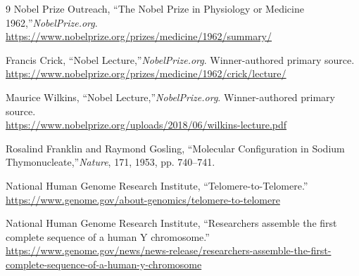 \begin{thebibliography}{9}
Nobel Prize Outreach, ``The Nobel Prize in Physiology or Medicine 1962,''\emph{NobelPrize.org}.\\
\url{https://www.nobelprize.org/prizes/medicine/1962/summary/}

Francis Crick, ``Nobel Lecture,''\emph{NobelPrize.org}. Winner-authored primary source.\\
\url{https://www.nobelprize.org/prizes/medicine/1962/crick/lecture/}

Maurice Wilkins, ``Nobel Lecture,''\emph{NobelPrize.org}. Winner-authored primary source.\\
\url{https://www.nobelprize.org/uploads/2018/06/wilkins-lecture.pdf}

Rosalind Franklin and Raymond Gosling, ``Molecular Configuration in Sodium Thymonucleate,''\textit{Nature}, 171, 1953, pp. 740--741.

National Human Genome Research Institute, ``Telomere-to-Telomere.''\\
\url{https://www.genome.gov/about-genomics/telomere-to-telomere}

National Human Genome Research Institute, ``Researchers assemble the first complete sequence of a human Y chromosome.''\\
\url{https://www.genome.gov/news/news-release/researchers-assemble-the-first-complete-sequence-of-a-human-y-chromosome}
\end{thebibliography}
